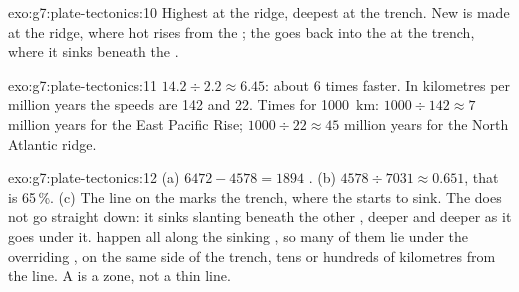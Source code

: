 \begin{solution}{exo:g7:plate-tectonics:10}
Highest at the ridge, deepest at the trench. New  is made at the
ridge, where hot  rises from the ; the   goes back into
the  at the trench, where it sinks beneath the .
\end{solution}

\begin{solution}{exo:g7:plate-tectonics:11}
$14.2 \div 2.2 \approx 6.45$: about 6 times faster. In
kilometres per million years the speeds are 142 and 22. Times for
\qty{1000}{km}: $1000 \div 142 \approx 7$ million years for the East
Pacific Rise; $1000 \div 22 \approx 45$ million years for the North
Atlantic ridge.
\end{solution}

\begin{solution}{exo:g7:plate-tectonics:12}
(a) $6472 - 4578 = 1894$ . (b) $4578 \div 7031 \approx 0.651$,
that is 65\,\%. (c) The line on the  marks the trench, where the 
 starts to sink. The  does not go straight down: it sinks
slanting beneath the other , deeper and deeper as it goes under it.
 happen all along the sinking , so many of them lie under
the overriding , on the same side of the trench, tens or hundreds of
kilometres from the line. A  is a zone, not a thin line.
\end{solution}

